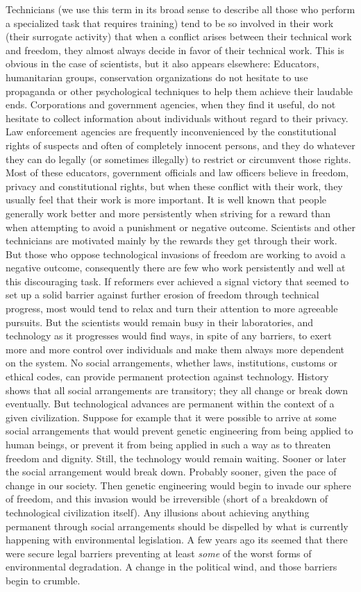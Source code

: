 Technicians (we use this term in its broad sense to describe all those who perform a specialized task that requires training) tend to be so involved in their work (their surrogate activity) that when a conflict arises between their technical work and freedom, they almost always decide in favor of their technical work. This is obvious in the case of scientists, but it also appears elsewhere: Educators, humanitarian groups, conservation organizations do not hesitate to use propaganda or other psychological techniques to help them achieve their laudable ends. Corporations and government agencies, when they find it useful, do not hesitate to collect information about individuals without regard to their privacy. Law enforcement agencies are frequently inconvenienced by the constitutional rights of suspects and often of completely innocent persons, and they do whatever they can do legally (or sometimes illegally) to restrict or circumvent those rights. Most of these educators, government officials and law officers believe in freedom, privacy and constitutional rights, but when these conflict with their work, they usually feel that their work is more important.
 It is well known that people generally work better and more persistently when striving for a reward than when attempting to avoid a punishment or negative outcome. Scientists and other technicians are motivated mainly by the rewards they get through their work. But those who oppose technological invasions of freedom are working to avoid a negative outcome, consequently there are few who work persistently and well at this discouraging task. If reformers ever achieved a signal victory that seemed to set up a solid barrier against further erosion of freedom through technical progress, most would tend to relax and turn their attention to more agreeable pursuits. But the scientists would remain busy in their laboratories, and technology as it progresses would find ways, in spite of any barriers, to exert more and more control over individuals and make them always more dependent on the system.
 No social arrangements, whether laws, institutions, customs or ethical codes, can provide permanent protection against technology. History shows that all social arrangements are transitory; they all change or break down eventually. But technological advances are permanent within the context of a given civilization. Suppose for example that it were possible to arrive at some social arrangements that would prevent genetic engineering from being applied to human beings, or prevent it from being applied in such a way as to threaten freedom and dignity. Still, the technology would remain waiting. Sooner or later the social arrangement would break down. Probably sooner, given the pace of change in our society. Then genetic engineering would begin to invade our sphere of freedom, and this invasion would be irreversible (short of a breakdown of technological civilization itself). Any illusions about achieving anything permanent through social arrangements should be dispelled by what is currently happening with environmental legislation. A few years ago its seemed that there were secure legal barriers preventing at least {\em some} of the worst forms of environmental degradation. A change in the political wind, and those barriers begin to crumble.

